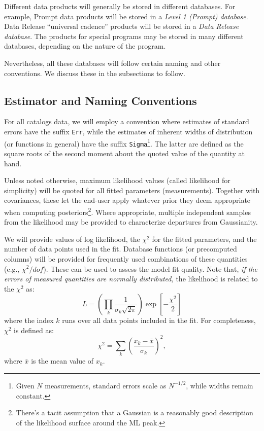 \documentclass[SE,lsstdraft,toc]{lsstdoc}
\begin{document}
Different data products will generally be stored in different databases. For example, Prompt data products will be stored in a \emph{Level 1 (Prompt) database}. Data Release ``universal cadence'' products will be stored in a \emph{Data Release database}. The products for special programs may be stored in many different databases, depending on the nature of the program.

Nevertheless, all these databases will follow certain naming and other conventions. We discuss these in the subsections to follow.

\subsection{Estimator and Naming Conventions}

For all catalogs data, we will employ a convention where estimates of standard errors have the suffix \texttt{Err}, while the estimates of inherent widths of distribution (or functions in general) have the suffix \texttt{Sigma}\footnote{Given $N$ measurements, standard errors scale as $N^{-1/2}$, while widths remain constant.}. The latter are defined as the square roots of the second moment about the quoted value of the quantity at hand.

Unless noted otherwise, maximum likelihood values (called likelihood for simplicity) will be quoted for all fitted parameters (measurements). Together with covariances, these let the end-user apply whatever prior they deem appropriate when computing posteriors\footnote{There's a tacit assumption that a Gaussian is a reasonably good description of the likelihood surface around the ML peak.}. Where appropriate, multiple independent samples from the likelihood may be provided to characterize departures from Gaussianity.

We will provide values of log likelihood, the $\chi^2$ for the fitted parameters, and the number of data points used in the fit. Database functions (or precomputed columns) will be provided for frequently used combinations of these quantities (e.g., $\chi^2/dof$). These can be used to assess the model fit quality. Note that, \textit{if the errors of measured quantities are normally distributed,} the likelihood is related to the $\chi^2$ as:
%
\begin{equation}
    L = \left(\prod_{k}\frac{1}{\sigma_k \sqrt{2 \pi}}\right) \exp \left[- \frac{\chi^2}{2}\right]
\end{equation}
%
where the index $k$ runs over all data points included in the fit.
For completeness, $\chi^2$ is defined as:
%
\begin{equation}
      \chi^2 = \sum_{k} \left( \frac{x_k-\bar{x}}{\sigma_k}\right)^2,
\end{equation}
%
where $\bar{x}$ is the mean value of $x_k$.
\end{document}
